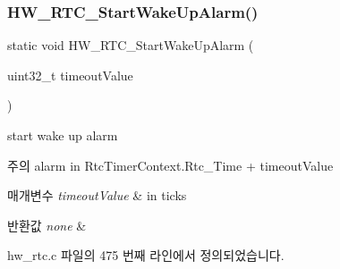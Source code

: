 \subsubsection{\texorpdfstring{H\+W\+\_\+\+R\+T\+C\+\_\+\+Start\+Wake\+Up\+Alarm()}{HW\_RTC\_StartWakeUpAlarm()}}
{\footnotesize\ttfamily static void H\+W\+\_\+\+R\+T\+C\+\_\+\+Start\+Wake\+Up\+Alarm (\begin{DoxyParamCaption}\item[{uint32\+\_\+t}]{timeout\+Value }\end{DoxyParamCaption})\hspace{0.3cm}{\ttfamily [static]}}



start wake up alarm 

\begin{DoxyNote}{주의}
alarm in Rtc\+Timer\+Context.\+Rtc\+\_\+\+Time + timeout\+Value 
\end{DoxyNote}

\begin{DoxyParams}{매개변수}
{\em timeout\+Value} & in ticks \\
\hline
\end{DoxyParams}

\begin{DoxyRetVals}{반환값}
{\em none} & \\
\hline
\end{DoxyRetVals}


hw\+\_\+rtc.\+c 파일의 475 번째 라인에서 정의되었습니다.


